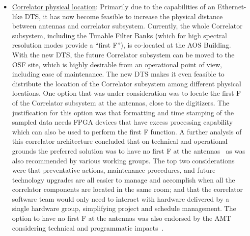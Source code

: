 \begin{itemize}[itemsep=-0.5em]
    An important consequence of adopting a COTS Ethernet solution for the DTS is that it will no longer be a real-time transmission channel since it is packet-based. This issue can be resolved in the ALMA 2030 system architecture by accurately time-stamping the data samples produced by the digitizers. By making this metadata available to the correlator subsystem, it will still be feasible to perform the correlation function. In fact, this correlation function does not need to be done in real-time, each data sample has an unambiguous time stamp, but in practice it will be done by the upgraded system architecture in near real-time.
    Accurately time stamping samples at the antennas increases the complexity of the digitizer electronics but this additional effort is well compensated by the use of a COTS DTS solution compared to a custom one.
    \item \underline{Correlator physical location}: Primarily due to the capabilities of an Ethernet-like DTS, it has now become feasible to increase the physical distance between antennas and correlator subsystem. Currently, the whole Correlator subsystem, including the Tunable Filter Banks (which for high spectral resolution modes provide a ``first F''), is co-located at the AOS Building. With the new DTS, the future Correlator subsystem can be moved to the OSF site, which is highly desirable from an operational point of view, including ease of maintenance. The new DTS makes it even feasible to distribute the location of the Correlator subsystem among different physical locations. One option that was under consideration was to locate the first F of the Correlator subsystem at the antennas, close to the digitizers. The justification for this option was that formatting and time stamping of the sampled data needs FPGA devices that have excess processing capability which can also be used to perform the first F function. A further analysis of this correlator architecture concluded that on technical and operational grounds the preferred solution was to have no first F at the antennas~\cite{IDTsubbanding} as was also recommended by various working groups.   The top two considerations were that preventative actions, maintenance procedures, and future technology upgrades are all easier to manage and accomplish when all the correlator components are located in the same room; and that the correlator software team would only need to interact with hardware delivered by a single hardware group, simplifying project and schedule management. The option to have no first F at the antennas was also endorsed by the AMT considering technical and programmatic impacts~\cite{ffx_decision}.
\end{itemize}




